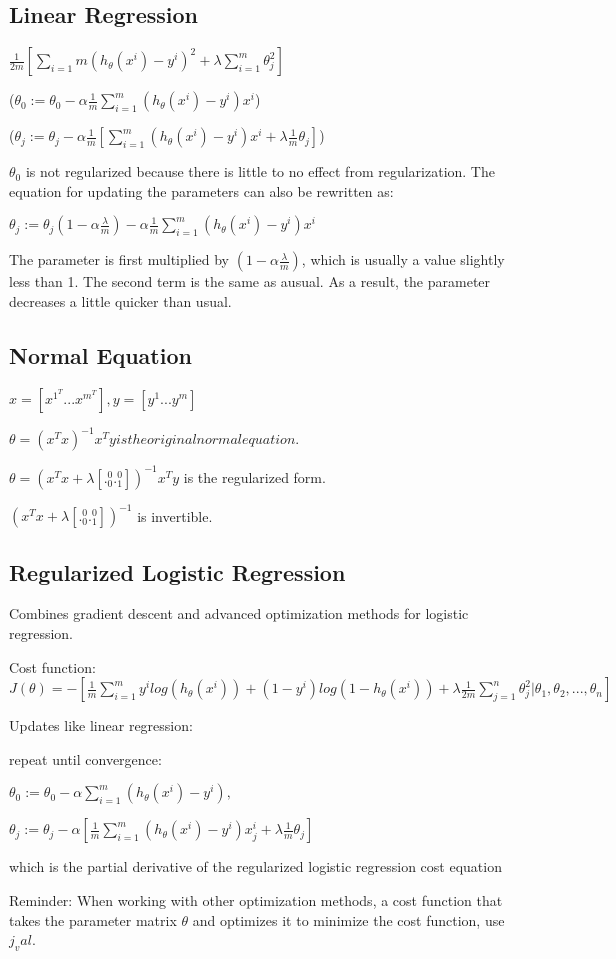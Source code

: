 \documentclass[12pt, twoside, a4paper]{book}
\begin{document}
\subsection{Linear Regression}

$\frac{1}{2m}[\sum_{i=1}{m}(h_{\theta}(x^i)-y^i)^2+\lambda\sum_{i=1}^{m}\theta_j^2]$

($\theta_0 := \theta_0 - \alpha\frac{1}{m}\sum_{i=1}^m(h_{\theta}(x^i)-y^i)x^i$)

($\theta_j := \theta_j-\alpha\frac{1}{m}[\sum_{i=1}^m(h_{\theta}(x^i)-y^i)x^i+\lambda\frac{1}{m}\theta_j]$)

$\theta_0$ is not regularized because there is little to no effect from regularization. The equation for updating the parameters can also be rewritten as:

$\theta_j := \theta_j(1-\alpha\frac{\lambda}{m})-\alpha\frac{1}{m}\sum_{i=1}^m(h_{\theta}(x^i)-y^i)x^i$

The parameter is first multiplied by $(1-\alpha\frac{\lambda}{m})$, which is usually a value slightly less than 1. The second term is the same as ausual. As a result, the parameter decreases a little quicker than usual.

\subsection{Normal Equation}

$x = [x^{1^T} ... x^{m^T}], y=[y^1 ... y^m]$

$\theta = (x^Tx)^{-1}x^Ty is the original normal equation.$

$\theta = (x^Tx+\lambda[.^0_0 .^0_1])^{-1}x^Ty$ is the regularized form.

$(x^Tx+\lambda[.^0_0 .^0_1])^{-1}$ is invertible.

\subsection{Regularized Logistic Regression}

Combines gradient descent and advanced optimization methods for logistic regression.

Cost function: $J(\theta)=-[\frac{1}{m}\sum_{i=1}^{m}y^{i}log(h_{\theta}(x^i))+(1-y^i)log(1-h_{\theta}(x^i))+\lambda\frac{1}{2m}\sum_{j=1}^{n}\theta_j^2|\theta_1,\theta_2,...,\theta_n]$

Updates like linear regression:

repeat until convergence:{$\theta_0:=\theta_0-\alpha\sum_{i=1}^m(h_\theta(x^i)-y^i),$

$\theta_j:=\theta_j-\alpha[\frac{1}{m}\sum_{i=1}^m(h_{\theta}(x^i)-y^i)x_j^i+\lambda\frac{1}{m}\theta_j]$}

which is the partial derivative of the regularized logistic regression cost equation

Reminder:
When working with other optimization methods, a cost function that takes the parameter matrix $\theta$ and optimizes it to minimize the cost function, use $j_val$.
\end{document}
